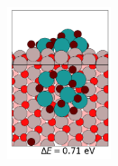 \documentclass{article}
\begin{document}
\begin{figure}[htp]
\begin{center}
{}
\subfigure
{
  \includegraphics[width=1.2in]{Pt7O10_Al2O3_Lowlying_DFTrelxed_6.png}
}

\end{center}
\end{figure}
\end{document}
